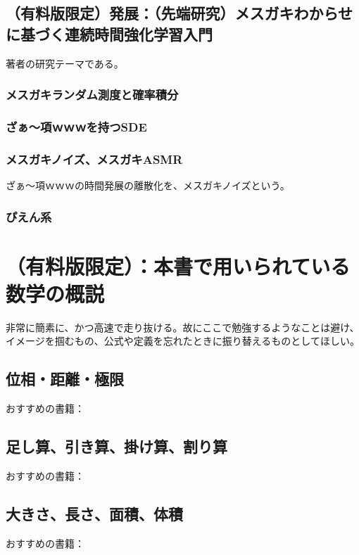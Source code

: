 \documentclass{jsarticle}
\begin{document}
\subsection{（有料版限定）発展：（先端研究）メスガキわからせに基づく連続時間強化学習入門}
著者の研究テーマである。




\subsubsection{メスガキランダム測度と確率積分}


\subsubsection{ざぁ～項ｗｗｗを持つSDE}

\subsubsection{メスガキノイズ、メスガキASMR}

ざぁ～項ｗｗｗの時間発展の離散化を、メスガキノイズという。


\subsubsection{ぴえん系}



\newpage
\section{（有料版限定）：本書で用いられている数学の概説}
非常に簡素に、かつ高速で走り抜ける。故にここで勉強するようなことは避け、イメージを掴むもの、公式や定義を忘れたときに振り替えるものとしてほしい。


\subsection{位相・距離・極限}
おすすめの書籍：



\subsection{足し算、引き算、掛け算、割り算}
おすすめの書籍：



\subsection{大きさ、長さ、面積、体積}
おすすめの書籍：
\end{document}
